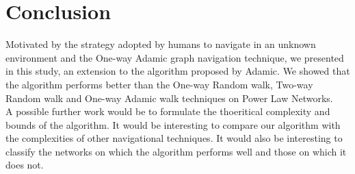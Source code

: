 \documentclass[a4paper,12pt]{article}
\begin{document}
\section{Conclusion}
\label{sec:4_conclusion}
Motivated by the strategy adopted by humans to navigate in an unknown environment and the One-way Adamic graph navigation technique, we presented in this study, an extension to the algorithm proposed by Adamic. We showed that the algorithm performs better than the One-way Random walk, Two-way Random walk and One-way Adamic walk techniques on Power Law Networks.\\

A possible further work would be to formulate the thoeritical complexity and bounds of the algorithm. It would be interesting to compare our algorithm with the complexities of other navigational techniques. It would also be interesting to classify the networks on which the algorithm performs well and those on which it does not.



\end{document}
